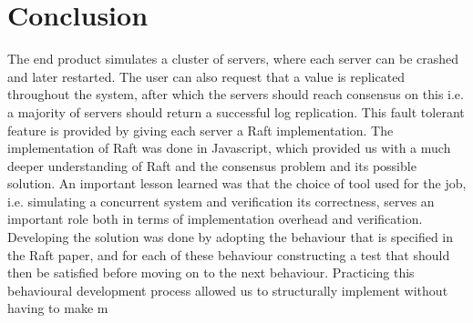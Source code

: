 \section{Conclusion} %
\label{sec:conclusion}
The end product simulates a cluster of servers, where each server can be crashed and later restarted. The user can also request that a value is replicated throughout the system, after which the servers should reach consensus on this i.e. a majority of servers should return a successful log replication. This fault tolerant feature is provided by giving each server a Raft implementation.
The implementation of Raft was done in Javascript, which provided us with a much deeper understanding of Raft and the consensus problem and its possible solution. An important lesson learned was that the choice of tool used for the job, i.e. simulating a concurrent system and verification its correctness, serves an important role both in terms of implementation overhead and verification.
Developing the solution was done by adopting the behaviour that is specified in the Raft paper, and for each of these behaviour constructing a test that should then be satisfied before moving on to the next behaviour. Practicing this behavioural development process allowed us to structurally implement without having to make m
